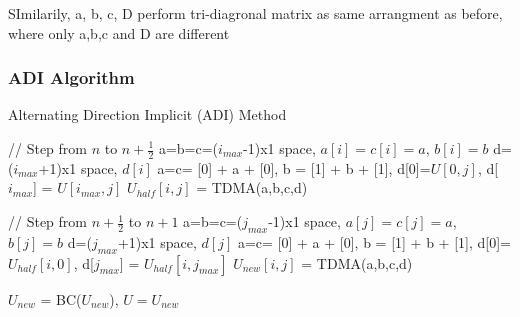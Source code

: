 \documentclass[12pt]{article}
\begin{document}
SImilarily, a, b, c, D perform tri-diagronal matrix as same
arrangment as before, where only a,b,c and D are different


\subsubsection{ADI Algorithm}

\begin{algorithm}[H]
    \small
\caption{Alternating Direction Implicit (ADI) Method}
\begin{algorithmic}[1]
 
    \State // Step from $n$ to $n+\frac{1}{2}$
      
        \State a=b=c=($i_{max}$-1)x1 space, $a[i] = c[i] = a$, $b[i]  = b$
        \State d=($i_{max}$+1)x1 space, $d[i]$
        \State a=c= [0] + a + [0], b = [1] + b + [1], d[0]=$U[0,j]$, d[$i_{max}$] = $U[i_{max},j]$
        \State $U_{half}[i,j]$ = TDMA(a,b,c,d)
    \EndFor
    
    \State // Step from $n+\frac{1}{2}$ to $n+1$
     
        \State a=b=c=($j_{max}$-1)x1 space, $a[j] = c[j] = a$, $b[j]  = b$
        \State d=($j_{max}$+1)x1 space, $d[j]$
        \State a=c= [0] + a + [0], b = [1] + b + [1], d[0]=$U_{half}[i,0]$, d[$j_{max}$] = $U_{half}[i,j_{max}]$
        \State $U_{new}[i,j]$ = TDMA(a,b,c,d)
    \EndFor
    
    \State $U_{new}$ = BC($U_{new}$), $U = U_{new}$ 
\EndFor

\end{algorithmic}
\end{algorithm}
\end{document}
